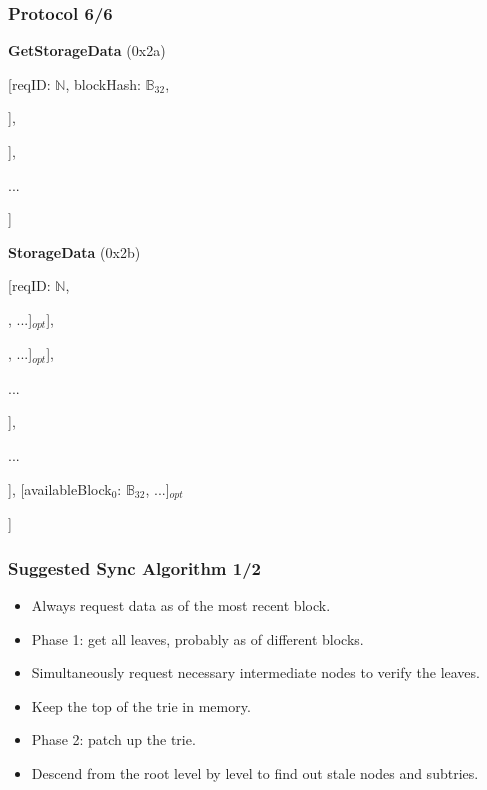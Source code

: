 \documentclass{beamer}
\begin{document}
\begin{frame}
  \frametitle{Protocol 6/6}

  \textbf{GetStorageData} (0x2a)

  [reqID: $\mathbb{N}$, blockHash: $\mathbb{B}_{32}$,
  
  \quad [addressHash$^0$: $\mathbb{B}_{32}$, [prefix$^0_0$: $\mathbb{Y}$, prefix$^0_1$: $\mathbb{Y}$, ...]],
  
  \quad [addressHash$^1$: $\mathbb{B}_{32}$, [prefix$^1_0$: $\mathbb{Y}$, prefix$^1_1$: $\mathbb{Y}$, ...]],
  
  \quad ...
  
  ]
  \bigskip

  \textbf{StorageData} (0x2b)
  \nopagebreak
  
  [reqID: $\mathbb{N}$,
  
  \quad [
  
  \qquad [
  
  \quad \qquad [status$^0_0$: $\mathbb{N}$, [[key$^0_{00}$: $\mathbb{B}_{32}$, val$^0_{00}$: $\mathbb{B}$], ...]$_{opt}$],
  
  \quad \qquad [status$^0_1$: $\mathbb{N}$, [[key$^0_{10}$: $\mathbb{B}_{32}$, val$^0_{10}$: $\mathbb{B}$], ...]$_{opt}$],
  
  \quad \qquad ...
  
  \qquad ],
  
  \qquad ...
  
  \quad ], [availableBlock$_0$: $\mathbb{B}_{32}$, ...]$_{opt}$
  
  ]

\end{frame}

\begin{frame}
  \frametitle{Suggested Sync Algorithm 1/2}

  \begin{itemize}
    \item Always request data as of the most recent block.
    \item Phase 1: get all leaves, probably as of different blocks.
    \item Simultaneously request necessary intermediate nodes to verify the leaves.
    \item Keep the top of the trie in memory.
    \item Phase 2: patch up the trie.
    \item Descend from the root level by level to find out stale nodes and subtries. 
  \end{itemize}

\end{frame}
\end{document}
